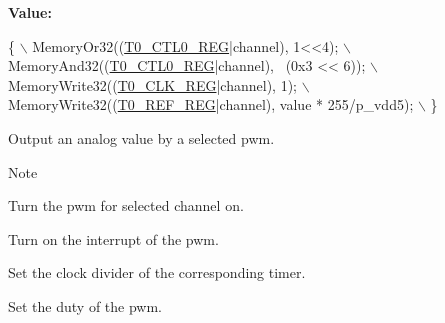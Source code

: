 {\bfseries Value\+:}
\begin{DoxyCode}
\{                                                               \(\backslash\)
    MemoryOr32((\mbox{\hyperlink{a00020_adadaa0ab1ebbd7ba9b70dfd24c3ed44da869abf9d87f78f45a0e07ad352abb39e}{T0\_CTL0\_REG}}|channel), 1<<4);                    \(\backslash\)
    MemoryAnd32((\mbox{\hyperlink{a00020_adadaa0ab1ebbd7ba9b70dfd24c3ed44da869abf9d87f78f45a0e07ad352abb39e}{T0\_CTL0\_REG}}|channel), ~(0x3 << 6));            \(\backslash\)
    MemoryWrite32((\mbox{\hyperlink{a00020_adadaa0ab1ebbd7ba9b70dfd24c3ed44da944380f6d792e04a4c2e84dc668581a3}{T0\_CLK\_REG}}|channel), 1);                     \(\backslash\)
    MemoryWrite32((\mbox{\hyperlink{a00020_adadaa0ab1ebbd7ba9b70dfd24c3ed44da7b512fe986ef45d3f84daa6bf6733200}{T0\_REF\_REG}}|channel), value * 255/p\_vdd5);    \(\backslash\)
\}
\end{DoxyCode}


Output an analog value by a selected pwm. 

\begin{DoxyNote}{Note}

\begin{DoxyEnumerate}
\item Turn the pwm for selected channel on.
\item Turn on the interrupt of the pwm.
\item Set the clock divider of the corresponding timer.
\item Set the duty of the pwm. 
\end{DoxyEnumerate}
\end{DoxyNote}

